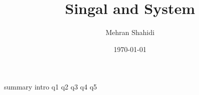 \documentclass{article}
\title{Singal and System}
\author{Mehran Shahidi}
\date{\today}
\begin{document}
\maketitle
{}
{summary}
\newpage
\tableofcontents
\newpage
{}
{intro}
{q1}
{q2}
{q3}
{q4}
{q5}

\newpage
\end{document}
